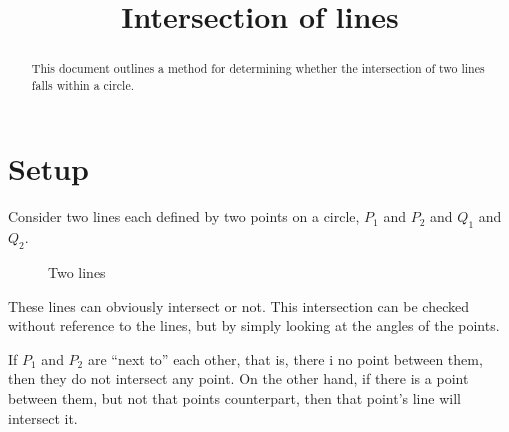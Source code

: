 \documentclass[twocolumn]{article}
\title{Intersection of lines}
\begin{document}
\maketitle

\begin{abstract}
This document outlines a method for determining whether the intersection of two lines falls within a circle.
\end{abstract}

\section{Setup}
Consider two lines each defined by two points on a circle, $P_1$ and $P_2$
and $Q_1$ and $Q_2$.

\vspace{1pc}

\begin{figure}[h]
\centering
{}
\caption{Two lines}
\end{figure}

These lines can obviously intersect or not. This intersection can be checked 
without reference to the lines, but by simply looking at the angles of the points.

If $P_1$ and $P_2$ are ``next to'' each other, that is, there i no point between them, then they do not intersect any point.
On the other hand, if there is a point between them, but not that points counterpart, then that point's line will intersect it.

\pagebreak
\end{document}
